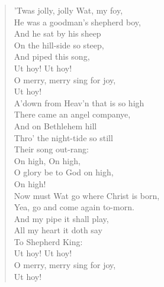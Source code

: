 
\begin{verse}
'Twas jolly, jolly Wat, my foy,\\
He was a goodman's shepherd boy,\\
\hspace*{2em}And he sat by his sheep\\
\hspace*{2em}On the hill-side so steep,\\
\hspace*{4em}And piped this song,\\
\hspace*{6em}Ut hoy! Ut hoy!\\
\hspace*{2em}O merry, merry sing for joy,\\
\hspace*{6em}Ut hoy!\\[0.7em]

A'down from Heav'n that is so high\\
There came an angel companye,\\
\hspace*{2em}And on Bethlehem hill\\
\hspace*{2em}Thro' the night-tide so still\\
\hspace*{4em}Their song out-rang:\\
\hspace*{6em}On high, On high,\\
\hspace*{2em}O glory be to God on high,\\
\hspace*{6em}On high!\\[0.7em]

Now must Wat go where Christ is born,\\
Yea, go and come again to-morn.\\
\hspace*{2em}And my pipe it shall play,\\
\hspace*{2em}All my heart it doth say\\
\hspace*{4em}To Shepherd King:\\
\hspace*{6em}Ut hoy! Ut hoy!\\
\hspace*{2em}O merry, merry sing for joy,\\
\hspace*{6em}Ut hoy!\\[0.7em]


\end{verse}

